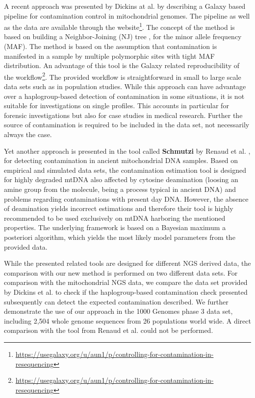 A recent approach was presented by Dickins at al. \cite{Dickins2014} by describing a Galaxy \cite{Goecks2010,Afgan2016} based pipeline for contamination control in mitochondrial genomes. The pipeline as well as the data are available through the website\footnote{\url{https://usegalaxy.org/u/aun1/p/controlling-for-contamination-in-resequencing}}.  The concept of the method is based on building a Neighbor-Joining (NJ) tree \cite{Saitou1987}, for the minor allele frequency (MAF). The method is based on the assumption that contamination is manifested in a sample by multiple polymorphic sites with tight MAF distribution. An advantage of this tool is the Galaxy related reproducibility of the workflow\footnote{\url{https://usegalaxy.org/u/aun1/p/controlling-for-contamination-in-resequencing}}. The provided workflow is straightforward in small to large scale data sets such as in population studies. While this approach can have advantage over a haplogroup-based detection of contamination in some situations, it is not suitable for investigations on single profiles.  This accounts in particular for forensic investigations but also for case studies in medical research. Further the source of contamination is required to be included in the data set, not necessarily always the case.

Yet another approach is presented in the tool called \textbf{Schmutzi} by Renaud et al. \cite{Renaud2015}, for detecting contamination in ancient mitochondrial DNA samples. Based on empirical and simulated data sets, the contamination estimation tool is designed for highly degraded mtDNA also affected by cytosine deamination (loosing an amine group from the molecule, being  a process typical in ancient DNA) and problems regarding contaminations with present day DNA.  However, the absence of deamination yields incorrect estimations and therefore their tool is highly recommended to be used exclusively on mtDNA harboring the mentioned properties. The underlying framework is based on a Bayesian maximum a posteriori algorithm, which yields the most likely model parameters from the provided data. 

While the presented related tools are designed for different NGS derived data, the comparison with our new method is performed on two different data sets. For comparison with the mitochondrial NGS data, we compare the data set provided by Dickins et al. \cite{Dickins2014} to check if the haplogroup-based contamination check presented subsequently can detect the expected contamination described. We further demonstrate the use of our approach in the 1000 Genomes phase 3 data set, including 2,504 whole genome sequences from 26 populations world wide. A direct comparison with the tool from Renaud et al. could not be performed.


